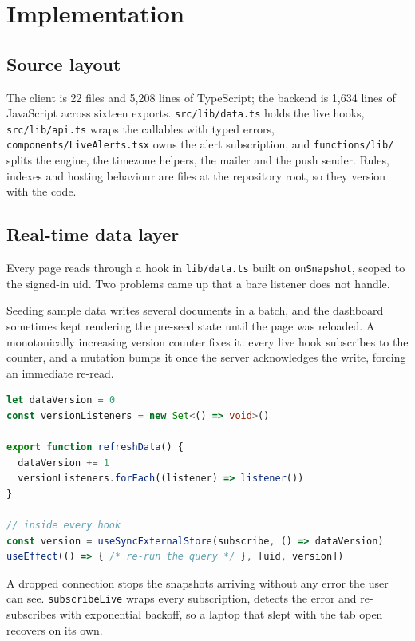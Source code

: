 \documentclass[11pt,a4paper]{report}
\begin{document}
\chapter{Implementation}

\section{Source layout}

The client is 22 files and 5,208 lines of TypeScript; the backend is 1,634 lines of JavaScript across
sixteen exports. \texttt{src/lib/data.ts} holds the live hooks, \texttt{src/lib/api.ts} wraps the
callables with typed errors, \texttt{components/LiveAlerts.tsx} owns the alert subscription, and
\texttt{functions/lib/} splits the engine, the timezone helpers, the mailer and the push sender. Rules,
indexes and hosting behaviour are files at the repository root, so they version with the code.

\section{Real-time data layer}

Every page reads through a hook in \texttt{lib/data.ts} built on \texttt{onSnapshot}, scoped to the
signed-in uid. Two problems came up that a bare listener does not handle.

Seeding sample data writes several documents in a batch, and the dashboard sometimes kept rendering the
pre-seed state until the page was reloaded. A monotonically increasing version counter fixes it: every
live hook subscribes to the counter, and a mutation bumps it once the server acknowledges the write,
forcing an immediate re-read.

\begin{lstlisting}[language=TypeScript,caption={Version bus that makes writes visible without a reload.},label={lst:bus}]
let dataVersion = 0
const versionListeners = new Set<() => void>()

export function refreshData() {
  dataVersion += 1
  versionListeners.forEach((listener) => listener())
}

// inside every hook
const version = useSyncExternalStore(subscribe, () => dataVersion)
useEffect(() => { /* re-run the query */ }, [uid, version])
\end{lstlisting}

A dropped connection stops the snapshots arriving without any error the user can see.
\texttt{subscribeLive} wraps every subscription, detects the error and re-subscribes with exponential
backoff, so a laptop that slept with the tab open recovers on its own.
\end{document}
